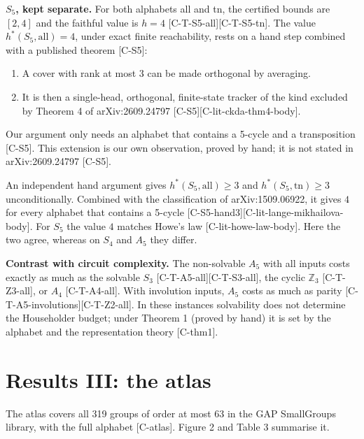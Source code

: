 \documentclass[10pt,twocolumn,a4paper]{article}
\providecommand{\tightlist}{\setlength{\itemsep}{0pt}\setlength{\parskip}{0pt}}
\begin{document}
\textbf{\(S_5\), kept separate.} For both alphabets all and tn, the certified bounds are \([2,4]\) and the faithful value is \(h = 4\) {[}C-T-S5-all{]}{[}C-T-S5-tn{]}. The value \(h^*(S_5,\text{all}) = 4\), under exact finite reachability, rests on a hand step combined with a published theorem {[}C-S5{]}:

\begin{enumerate}
\def\labelenumi{\arabic{enumi}.}
\tightlist
\item
  A cover with rank at most \(3\) can be made orthogonal by averaging.
\item
  It is then a single-head, orthogonal, finite-state tracker of the kind excluded by Theorem 4 of arXiv:2609.24797 {[}C-S5{]}{[}C-lit-ckda-thm4-body{]}.
\end{enumerate}

Our argument only needs an alphabet that contains a 5-cycle and a transposition {[}C-S5{]}. This extension is our own observation, proved by hand; it is not stated in arXiv:2609.24797 {[}C-S5{]}.

An independent hand argument gives \(h^*(S_5,\text{all}) \ge 3\) and \(h^*(S_5,\text{tn}) \ge 3\) unconditionally. Combined with the classification of arXiv:1509.06922, it gives \(4\) for every alphabet that contains a 5-cycle {[}C-S5-hand3{]}{[}C-lit-lange-mikhailova-body{]}. For \(S_5\) the value \(4\) matches Howe's law {[}C-lit-howe-law-body{]}. Here the two agree, whereas on \(S_4\) and \(A_5\) they differ.

\textbf{Contrast with circuit complexity.} The non-solvable \(A_5\) with all inputs costs exactly as much as the solvable \(S_3\) {[}C-T-A5-all{]}{[}C-T-S3-all{]}, the cyclic \(\mathbb{Z}_3\) {[}C-T-Z3-all{]}, or \(A_4\) {[}C-T-A4-all{]}. With involution inputs, \(A_5\) costs as much as parity {[}C-T-A5-involutions{]}{[}C-T-Z2-all{]}. In these instances solvability does not determine the Householder budget; under Theorem 1 (proved by hand) it is set by the alphabet and the representation theory {[}C-thm1{]}.

\section{Results III: the atlas}\label{results-iii-the-atlas}

The atlas covers all 319 groups of order at most 63 in the GAP SmallGroups library, with the full alphabet {[}C-atlas{]}. Figure 2 and Table 3 summarise it.
\end{document}
